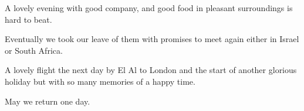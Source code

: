 A lovely evening with good company, and good food in pleasant
surroundings is hard to beat.

Eventually we took our leave of them with promises to meet again
either in Israel or South Africa.

A lovely flight the next day by El Al to London and the start of
another glorious holiday but with so many memories of a happy time.

May we return one day.

\clearpage
\thispagestyle{empty}
